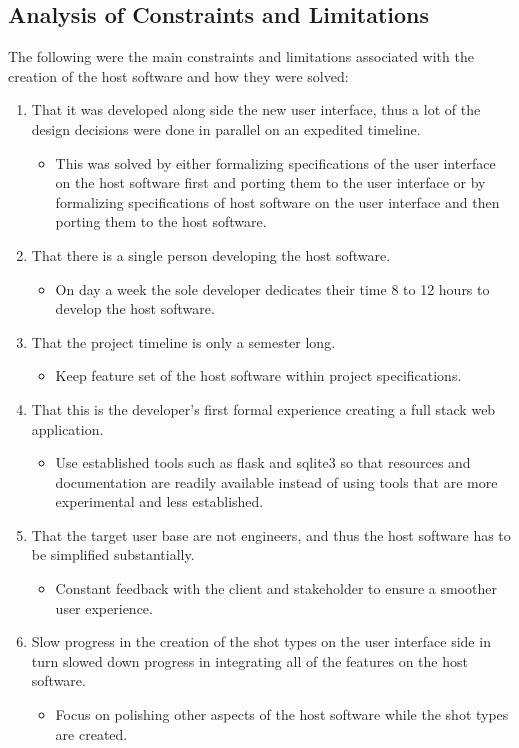 \documentclass[12pt]{article}
\begin{document}
\subsection{Analysis of Constraints and Limitations}
The following were the main constraints and limitations associated with the creation of the host software and how they were solved:
\begin{enumerate}
	\item That it was developed along side the new user interface, thus a lot of the design decisions were done in parallel on an expedited timeline.
	      \begin{itemize}
		      \item This was solved by either formalizing specifications of the user interface on the host software first and porting them to the user interface or by formalizing specifications of host software on the user interface and then porting them to the host software.
	      \end{itemize}
	\item That there is a single person developing the host software.
	      \begin{itemize}
		      \item On day a week the sole developer dedicates their time 8 to 12 hours to develop the host software.
	      \end{itemize}
	\item That the project timeline is only a semester long.
	      \begin{itemize}
		      \item Keep feature set of the host software within project specifications.
	      \end{itemize}
	\item That this is the developer's first formal experience creating a full stack web application.
	      \begin{itemize}
		      \item Use established tools such as flask and sqlite3 so that resources and documentation are readily available instead of using tools that are more experimental and less established.
	      \end{itemize}
	\item That the target user base are not engineers, and thus the host software has to be simplified substantially.
	      \begin{itemize}
		      \item Constant feedback with the client and stakeholder to ensure a smoother user experience.
	      \end{itemize}
	\item Slow progress in the creation of the shot types on the user interface side in turn slowed down progress in integrating all of the features on the host software.
	      \begin{itemize}
		      \item Focus on polishing other aspects of the host software while the shot types are created.
	      \end{itemize}
\end{enumerate}
\end{document}
